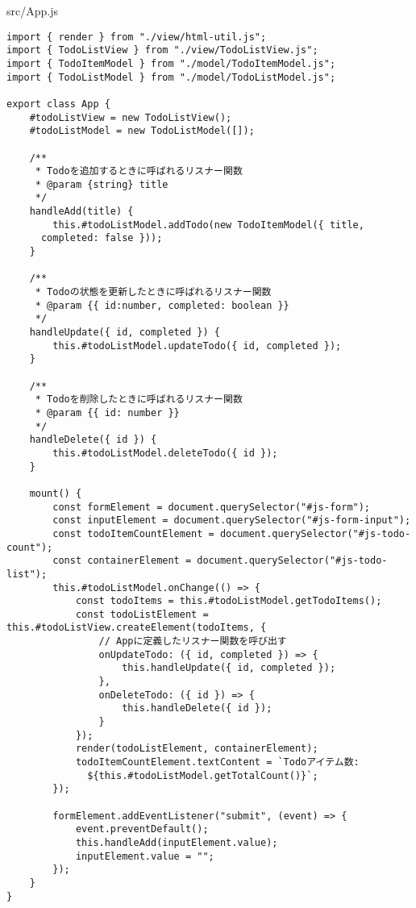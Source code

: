 \begin{listtitle}
src/App.js
\end{listtitle}
\begin{lstlisting}
import { render } from "./view/html-util.js";
import { TodoListView } from "./view/TodoListView.js";
import { TodoItemModel } from "./model/TodoItemModel.js";
import { TodoListModel } from "./model/TodoListModel.js";

export class App {
    #todoListView = new TodoListView();
    #todoListModel = new TodoListModel([]);

    /**
     * Todoを追加するときに呼ばれるリスナー関数
     * @param {string} title
     */
    handleAdd(title) {
        this.#todoListModel.addTodo(new TodoItemModel({ title,
	  completed: false }));
    }

    /**
     * Todoの状態を更新したときに呼ばれるリスナー関数
     * @param {{ id:number, completed: boolean }}
     */
    handleUpdate({ id, completed }) {
        this.#todoListModel.updateTodo({ id, completed });
    }

    /**
     * Todoを削除したときに呼ばれるリスナー関数
     * @param {{ id: number }}
     */
    handleDelete({ id }) {
        this.#todoListModel.deleteTodo({ id });
    }

    mount() {
        const formElement = document.querySelector("#js-form");
        const inputElement = document.querySelector("#js-form-input");
        const todoItemCountElement = document.querySelector("#js-todo-count");
        const containerElement = document.querySelector("#js-todo-list");
        this.#todoListModel.onChange(() => {
            const todoItems = this.#todoListModel.getTodoItems();
            const todoListElement = this.#todoListView.createElement(todoItems, {
                // Appに定義したリスナー関数を呼び出す
                onUpdateTodo: ({ id, completed }) => {
                    this.handleUpdate({ id, completed });
                },
                onDeleteTodo: ({ id }) => {
                    this.handleDelete({ id });
                }
            });
            render(todoListElement, containerElement);
            todoItemCountElement.textContent = `Todoアイテム数:
              ${this.#todoListModel.getTotalCount()}`;
        });

        formElement.addEventListener("submit", (event) => {
            event.preventDefault();
            this.handleAdd(inputElement.value);
            inputElement.value = "";
        });
    }
}
\end{lstlisting}
\listend
